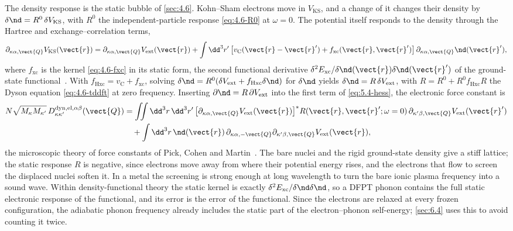 The density response is the static bubble of \cref{sec:4.6}. Kohn--Sham electrons move in $V_{\mathrm{KS}}$, and a change of it changes their density by $\delta\nd = R^0\,\delta V_{\mathrm{KS}}$, with $R^0$ the independent-particle response \cref{eq:4.6-R0} at $\omega = 0$. The potential itself responds to the density through the Hartree and exchange--correlation terms,
\begin{equation}
  \partial_{\kappa\alpha,\vect{Q}}V_{\mathrm{KS}}(\vect{r}) = \partial_{\kappa\alpha,\vect{Q}}V_{\mathrm{ext}}(\vect{r}) + \int\dd^3r'\,\bigl[v_{\mathrm{C}}(\vect{r}-\vect{r}') + f_{\mathrm{xc}}(\vect{r},\vect{r}')\bigr]\,\partial_{\kappa\alpha,\vect{Q}}\nd(\vect{r}') ,
  \label{eq:5.4-dV}
\end{equation}
where $f_{\mathrm{xc}}$ is the kernel \cref{eq:4.6-fxc} in its static form, the second functional derivative $\delta^2E_{\mathrm{xc}}/\delta\nd(\vect{r})\delta\nd(\vect{r}')$ of the ground-state functional~\cite[Eqs.~(42)--(46)]{giustino2017electron}. With $f_{\mathrm{Hxc}} = v_{\mathrm{C}} + f_{\mathrm{xc}}$, solving $\delta\nd = R^0(\delta V_{\mathrm{ext}} + f_{\mathrm{Hxc}}\delta\nd)$ for $\delta\nd$ yields $\delta\nd = R\,\delta V_{\mathrm{ext}}$, with $R = R^0 + R^0f_{\mathrm{Hxc}}R$ the Dyson equation \cref{eq:4.6-tddft} at zero frequency. Inserting $\partial\nd = R\,\partial V_{\mathrm{ext}}$ into the first term of \cref{eq:5.4-hess}, the electronic force constant is
\begin{equation*}
  \begin{split}
  N\sqrt{M_\kappa M_{\kappa'}}\,D^{\mathrm{dyn,el},\alpha\beta}_{\kappa\kappa'}(\vect{Q})
  &= \iint\dd^3r\,\dd^3r'\,\bigl[\partial_{\kappa\alpha,\vect{Q}}V_{\mathrm{ext}}(\vect{r})\bigr]^*R(\vect{r},\vect{r}';\omega = 0)\,\partial_{\kappa'\beta,\vect{Q}}V_{\mathrm{ext}}(\vect{r}') \\
  &\quad + \int\dd^3r\,\nd(\vect{r})\,\partial_{\kappa\alpha,-\vect{Q}}\partial_{\kappa'\beta,\vect{Q}}V_{\mathrm{ext}}(\vect{r}) ,
  \end{split}
\end{equation*}
the microscopic theory of force constants of Pick, Cohen and Martin~\cite{pick1970microscopic}. The bare nuclei and the rigid ground-state density give a stiff lattice; the static response $R$ is negative, since electrons move away from where their potential energy rises, and the electrons that flow to screen the displaced nuclei soften it. In a metal the screening is strong enough at long wavelength to turn the bare ionic plasma frequency into a sound wave. Within density-functional theory the static kernel is exactly $\delta^2E_{\mathrm{xc}}/\delta\nd\delta\nd$, so a DFPT phonon contains the full static electronic response of the functional, and its error is the error of the functional. Since the electrons are relaxed at every frozen configuration, the adiabatic phonon frequency already includes the static part of the electron--phonon self-energy; \cref{sec:6.4} uses this to avoid counting it twice.

